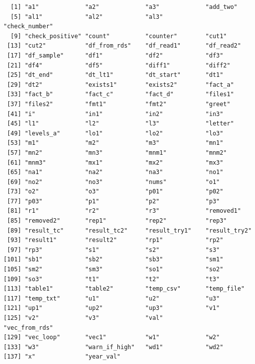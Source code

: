 \documentclass[
  letterpaper,
  DIV=11,
  numbers=noendperiod]{scrartcl}
\begin{document}
\begin{verbatim}
  [1] "a1"             "a2"             "a3"             "add_two"       
  [5] "al1"            "al2"            "al3"            "check_number"  
  [9] "check_positive" "count"          "counter"        "cut1"          
 [13] "cut2"           "df_from_rds"    "df_read1"       "df_read2"      
 [17] "df_sample"      "df1"            "df2"            "df3"           
 [21] "df4"            "df5"            "diff1"          "diff2"         
 [25] "dt_end"         "dt_lt1"         "dt_start"       "dt1"           
 [29] "dt2"            "exists1"        "exists2"        "fact_a"        
 [33] "fact_b"         "fact_c"         "fact_d"         "files1"        
 [37] "files2"         "fmt1"           "fmt2"           "greet"         
 [41] "i"              "in1"            "in2"            "in3"           
 [45] "l1"             "l2"             "l3"             "letter"        
 [49] "levels_a"       "lo1"            "lo2"            "lo3"           
 [53] "m1"             "m2"             "m3"             "mn1"           
 [57] "mn2"            "mn3"            "mnm1"           "mnm2"          
 [61] "mnm3"           "mx1"            "mx2"            "mx3"           
 [65] "na1"            "na2"            "na3"            "no1"           
 [69] "no2"            "no3"            "nums"           "o1"            
 [73] "o2"             "o3"             "p01"            "p02"           
 [77] "p03"            "p1"             "p2"             "p3"            
 [81] "r1"             "r2"             "r3"             "removed1"      
 [85] "removed2"       "rep1"           "rep2"           "rep3"          
 [89] "result_tc"      "result_tc2"     "result_try1"    "result_try2"   
 [93] "result1"        "result2"        "rp1"            "rp2"           
 [97] "rp3"            "s1"             "s2"             "s3"            
[101] "sb1"            "sb2"            "sb3"            "sm1"           
[105] "sm2"            "sm3"            "so1"            "so2"           
[109] "so3"            "t1"             "t2"             "t3"            
[113] "table1"         "table2"         "temp_csv"       "temp_file"     
[117] "temp_txt"       "u1"             "u2"             "u3"            
[121] "up1"            "up2"            "up3"            "v1"            
[125] "v2"             "v3"             "val"            "vec_from_rds"  
[129] "vec_loop"       "vec1"           "w1"             "w2"            
[133] "w3"             "warn_if_high"   "wd1"            "wd2"           
[137] "x"              "year_val"      
\end{verbatim}
\end{document}
